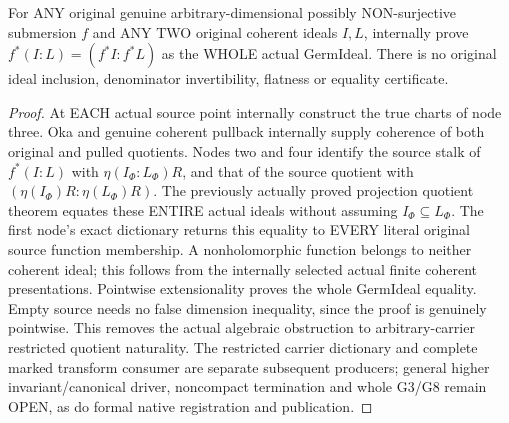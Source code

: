 \begin{theorem}
\label{hir:submersion-germ-colon-entire-sheaf-equality}
\leanok
For ANY original genuine arbitrary-dimensional possibly NON-surjective
submersion $f$ and ANY TWO original coherent ideals $I,L$, internally prove
$f^*(I:L)=(f^*I:f^*L)$ as the WHOLE actual GermIdeal. There is no original
ideal inclusion, denominator invertibility, flatness or equality certificate.
\end{theorem}
\begin{proof}
At EACH actual source point internally construct the true charts of node
three. Oka and genuine coherent pullback internally supply coherence of
both original and pulled quotients. Nodes two and four identify the source
stalk of $f^*(I:L)$ with $\eta(I_\Phi:L_\Phi)R$, and that of the source
quotient with $(\eta(I_\Phi)R:\eta(L_\Phi)R)$. The previously actually proved
projection quotient theorem equates these ENTIRE actual ideals without
assuming $I_\Phi\subseteq L_\Phi$. The first node's exact dictionary returns
this equality to EVERY literal original source function membership. A
nonholomorphic function belongs to neither coherent ideal; this follows
from the internally selected actual finite coherent presentations. Pointwise
extensionality proves the whole GermIdeal equality. Empty source needs no
false dimension inequality, since the proof is genuinely pointwise.
This removes the actual algebraic obstruction to arbitrary-carrier restricted
quotient naturality. The restricted carrier dictionary and complete marked
transform consumer are separate subsequent producers; general higher
invariant/canonical driver, noncompact termination and whole G3/G8 remain
OPEN, as do formal native registration and publication.
\end{proof}
